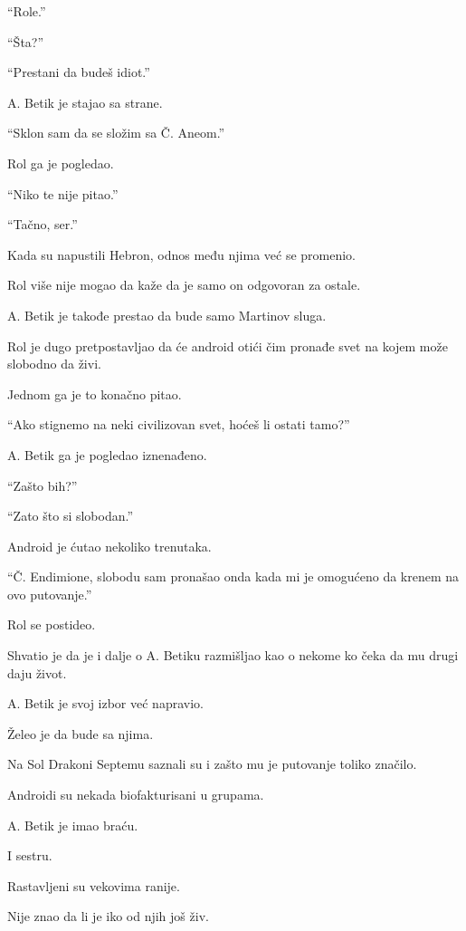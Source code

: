 ``Role.''

``Šta?''

``Prestani da budeš idiot.''

\bigskip

A. Betik je stajao sa strane.

``Sklon sam da se složim sa Č. Aneom.''

Rol ga je pogledao.

``Niko te nije pitao.''

``Tačno, ser.''

\bigskip

Kada su napustili Hebron, odnos među njima već se promenio.

Rol više nije mogao da kaže da je samo on odgovoran za ostale.

\bigskip

A. Betik je takođe prestao da bude samo Martinov sluga.

Rol je dugo pretpostavljao da će android otići čim pronađe svet na kojem može slobodno da živi.

Jednom ga je to konačno pitao.

``Ako stignemo na neki civilizovan svet, hoćeš li ostati tamo?''

A. Betik ga je pogledao iznenađeno.

``Zašto bih?''

``Zato što si slobodan.''

Android je ćutao nekoliko trenutaka.

``Č. Endimione, slobodu sam pronašao onda kada mi je omogućeno da krenem na ovo putovanje.''

\bigskip

Rol se postideo.

Shvatio je da je i dalje o A. Betiku razmišljao kao o nekome ko čeka da mu drugi daju život.

A. Betik je svoj izbor već napravio.

Želeo je da bude sa njima.

\bigskip

Na Sol Drakoni Septemu saznali su i zašto mu je putovanje toliko značilo.

Androidi su nekada biofakturisani u grupama.

A. Betik je imao braću.

I sestru.

Rastavljeni su vekovima ranije.

Nije znao da li je iko od njih još živ.

\bigskip

